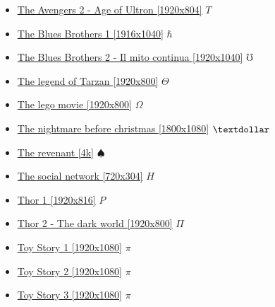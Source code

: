 \begin{itemize}
			\item \href{https://mega.nz/#!Mr4TSBLB!BDONcTk4FrOzyAYPMLLacO5riWhxEGX_WlxNoHyURHU} {The Avengers 2 - Age of Ultron [1920x804]}  $T$ \\
			\item \href{https://mega.nz/#!rnp3wKJC!EIlE_7m423TD6onEctV_dKNSf6-DSYyxXOiYB8xiQkA} {The Blues Brothers 1 [1916x1040]}  $\hbar$ \\
			\item \href{https://mega.nz/#!SnQSWaTa!DspuB1UhuRFzEzXZyhP38N1gEJs6S2dWkfKSlvXFB0o} {The Blues Brothers 2 - Il mito continua [1920x1040]}  $\mho$ \\
			\item \href{https://mega.nz/#!AKxTgJKJ!OmaClcJ3ZzeYtSznLsO5C1DqMCmBFsOBmHBWUxVdMrE} {The legend of Tarzan [1920x800]}  $\varTheta$ \\
			\item \href{https://mega.nz/#!wnYBCBQa!tjkDIqwQrzRX4d-DjM-Q9LYqpaEP9Df_SU_Lr1FPeMU} {The lego movie [1920x800]}  $\Omega$ \\
			\item \href{https://mega.nz/#!7mIyRDpT!gj0tfzsJ4m1W8UkT0wzZ1lEKICnB5xwZ3JZU4Dueb_k} {The nightmare before christmas [1800x1080]}  $\textdollar$ \\
			\item \href{https://mega.nz/#!iH5j1ZaR!Q_omZ5qoLf6npNgSDTlSRxa1FKxCB31RLL7S_LPuaWY} {The revenant [4k]}  $\spadesuit$ \\
			\item \href{https://mega.nz/#!fhpnCbbA!iLLegh9uCxuy3sZ8GTPyHuNf7YHyLxLjSE1l0EWioUc} {The social network [720x304]}  $H$ \\
			\item \href{https://mega.nz/#!YGQmTaSD!pIjrC8WqCGl1fRve_t7HcPc3HLZ4wrvmboXyZnHIrMs} {Thor 1 [1920x816]}  $P$ \\
			\item \href{https://mega.nz/#!4CQzRYgY!Y0rLkeEW3HHgd1tkfWq_oDX1-TUXRpFiO9bJU_USDOs} {Thor 2 - The dark world [1920x800]}  $\Pi$ \\
			\item \href{https://mega.nz/#!REBmnTQK!39cdBd1lK6BaoUaAHiBGMGBAlAn3tgtR3955or3YxMI} {Toy Story 1 [1920x1080]}  $\pi$ \\ 
			\item \href{https://mega.nz/#!IRh2HApb!w94nmNU2Iy1EiZxS1YVJd2sY9J_sa5GfbCAQfLn9ihU} {Toy Story 2 [1920x1080]}  $\pi$ \\ 
			\item \href{https://mega.nz/#!kQIUUQTT!gQOqWL9IiOJqZ3k0nTC4zJRrPafrzlMJPOBAdeiFIOg} {Toy Story 3 [1920x1080]}  $\pi$ \\ 

\end{itemize}
